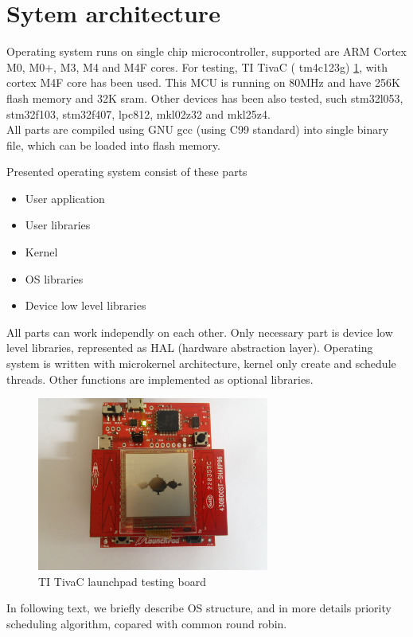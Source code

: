 \documentclass[conference]{IEEEtran}
\begin{document}
\section{Sytem architecture}

Operating system runs on single chip microcontroller, supported are ARM Cortex M0, M0+, M3, M4 and M4F cores. For testing, TI TivaC ( tm4c123g) \ref{fig_ti_launchpad}, with cortex M4F core has been used. This MCU is running on 80MHz and have 256K flash memory and 32K sram. Other devices has been also tested, such stm32l053, stm32f103, stm32f407, lpc812, mkl02z32 and mkl25z4. \\
All parts are compiled using GNU gcc (using C99 standard) into single binary file, which can be loaded into flash memory. 

Presented operating system consist of these parts

\begin{itemize}
	\item User application
	\item User libraries
	\item Kernel
	\item OS libraries
	\item Device low level libraries
\end{itemize}

All parts can work independly on each other. Only necessary part is device low level libraries, represented as HAL 
(hardware abstraction layer). Operating system is written with microkernel architecture, kernel only create and schedule threads. Other functions are implemented as optional libraries.

\begin{figure}[!t]
\centering
\includegraphics[width=3.0in]{testing_board_01.jpg}
\caption{TI TivaC launchpad testing board}
\label{fig_ti_launchpad}
\end{figure}

In following text, we briefly describe OS structure, and in more details priority scheduling algorithm, copared with common round robin.
\end{document}
